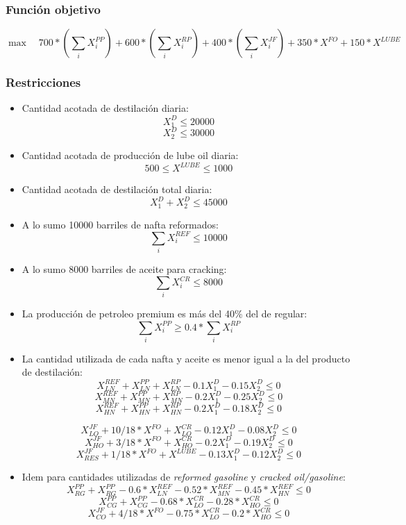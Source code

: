 \subsubsection{Función objetivo}
    $$ \max \quad 700*(\sum_{i} X^{PP}_i) + 600*(\sum_{i} X^{RP}_i) +
    400*(\sum_{i} X^{JF}_i) + 350*X^{FO} + 150*X^{LUBE} $$

\subsubsection{Restricciones}
    \begin{itemize}
        \item Cantidad acotada de destilación diaria:
        $$X^D_1 \leq 20000$$
        $$X^D_2 \leq 30000$$

        \item Cantidad acotada de producción de lube oil diaria:
        $$500 \leq X^{LUBE} \leq 1000$$

        \item Cantidad acotada de destilación total diaria:
        $$X^D_1 + X^D_2 \leq 45000$$

        \item A lo sumo 10000 barriles de nafta reformados:
        $$ \sum_i X^{REF}_i \leq 10000 $$

        \item A lo sumo 8000 barriles de aceite para cracking:
        $$ \sum_i X^{CR}_i \leq 8000 $$

        \item La producción de petroleo premium es más del 40\% del de regular:
        $$ \sum_i X^{PP}_i \geq 0.4 * \sum_i X^{RP}_i $$

        \item La cantidad utilizada de cada nafta y aceite es menor igual a la del producto de destilación:
        $$ X^{REF}_{LN} + X^{PP}_{LN} + X^{RP}_{LN} - 0.1 X^D_1 - 0.15 X^D_2 \leq 0 $$
        $$ X^{REF}_{MN} + X^{PP}_{MN} + X^{RP}_{MN} - 0.2 X^D_1 - 0.25 X^D_2 \leq 0 $$
        $$ X^{REF}_{HN} + X^{PP}_{HN} + X^{RP}_{HN} - 0.2 X^D_1 - 0.18 X^D_2 \leq 0 $$

        $$ X^{JF}_{LO} + 10/18*X^{FO} + X^{CR}_{LO} - 0.12  X^D_1 - 0.08  X^D_2 \leq 0 $$
        $$ X^{JF}_{HO} + 3/18*X^{FO} + X^{CR}_{HO} - 0.2  X^D_1 - 0.19  X^D_2 \leq 0 $$
        $$ X^{JF}_{RES}+ 1/18*X^{FO}  + X^{LUBE} - 0.13 X^D_1  - 0.12 X^D_2 \leq 0 $$

        \item Idem para cantidades utilizadas de \emph{reformed gasoline} y \emph{cracked oil/gasoline}:
        $$ X^{PP}_{RG} + X^{PP}_{RG} - 0.6 * X^{REF}_{LN} - 0.52 * X^{REF}_{MN} - 0.45 * X^{REF}_{HN} \leq 0 $$
        $$ X^{PP}_{CG} + X^{PP}_{CG} - 0.68 * X^{CR}_{LO} - 0.28 * X^{CR}_{HO} \leq 0 $$
        $$ X^{JF}_{CO} + 4/18 * X^{FO}  - 0.75 * X^{CR}_{LO} - 0.2 * X^{CR}_{HO} \leq 0 $$


\end{itemize}
